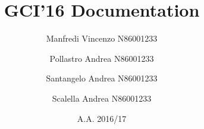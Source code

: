 \documentclass[11pt,a4paper,openright]{article}
\begin{document}
\title{\bfseries{GCI'16 Documentation}}
\author{Manfredi Vincenzo N86001233 \and Pollastro Andrea N86001233 \and Santangelo Andrea N86001233 \and Scalella Andrea N86001233}
\date{A.A. 2016/17}
\maketitle

\cleardoublepage
\tableofcontents
\cleardoublepage

\end{document}

